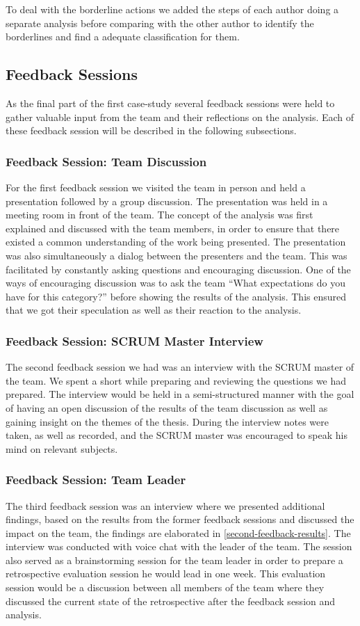 To deal with the borderline actions we added the steps of each author doing a separate analysis before comparing with the other author to identify the borderlines and find a adequate classification for them.

\subsection{Feedback Sessions}
As the final part of the first case-study several feedback sessions were held to gather valuable input from the team and their reflections on the analysis. Each of these feedback session will be described in the following subsections. 

\subsubsection{Feedback Session: Team Discussion}
For the first feedback session we visited the team in person and held a presentation followed by a group discussion. The presentation was held in a meeting room in front of the team. The concept of the analysis was first explained and discussed with the team members, in order to ensure that there existed a common understanding of the work being presented. The presentation was also simultaneously a dialog between the presenters and the team. This was facilitated by constantly asking questions and encouraging discussion. One of the ways of encouraging discussion was to ask the team ``What expectations do you have for this category?'' before showing the results of the analysis. This ensured that we got their speculation as well as their reaction to the analysis. 

\subsubsection{Feedback Session: SCRUM Master Interview}
The second feedback session we had was an interview with the SCRUM master of the team. We spent a short while preparing and reviewing the questions we had prepared. The interview would be held in a semi-structured manner with the goal of having an open discussion of the results of the team discussion as well as gaining insight on the themes of the thesis. During the interview notes were taken, as well as recorded, and the SCRUM master was encouraged to speak his mind on relevant subjects. 

\subsubsection{Feedback Session: Team Leader}
The third feedback session was an interview where we presented additional findings, based on the results from the former feedback sessions and discussed the impact on the team, the findings are elaborated in  \autoref{second-feedback-results}. The interview was conducted with voice chat with the leader of the team. The session also served as a brainstorming session for the team leader in order to prepare a retrospective evaluation session he would lead in one week. This evaluation session would be a discussion between all members of the team where they discussed the current state of the retrospective after the feedback session and analysis.

